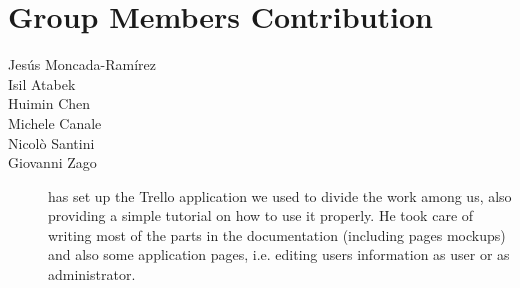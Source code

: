 \section{Group Members Contribution}

\begin{description}
    \item[Jes\'us Moncada-Ram\'irez]

    \item[Isil Atabek]

    \item[Huimin Chen]

    \item[Michele	Canale]

    \item[Nicol\`o Santini]

    \item[Giovanni Zago] has set up the Trello application we used to divide the work among us, also providing a simple tutorial on how to use it properly. He took care of writing most of the parts in the documentation (including pages mockups) and also some application pages, i.e. editing users information as user or as administrator.
\end{description}